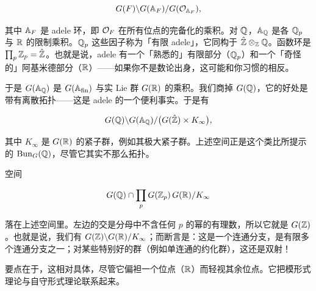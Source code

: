 \[G(F)\backslash G(\mathbb{A}_F)/G(\mathcal{O}_{\mathbb{A}_F}),\]

其中 $\mathbb{A}_F$ 是 adele 环，即 $\mathcal{O}_F$ 在所有位点的完备化的乘积。对 $\mathbb{Q}$，$\mathbb{A}_{\mathbb{Q}}$ 是各 $\mathbb{Q}_p$ 与 $\mathbb{R}$ 的限制乘积。$\mathbb{Q}_p$ 这些因子称为「有限 adele」，它同构于 $\hat{\mathbb{Z}}\otimes_{\mathbb{Z}}\mathbb{Q}$。函数环是 $\prod_p \mathbb{Z}_p=\hat{\mathbb{Z}}$。也就是说，adele 有一个「熟悉的」有限部分（$\mathbb{Q}_p$）和一个「奇怪的」阿基米德部分（$\mathbb{R}$）——如果你不是数论出身，这可能和你习惯的相反。

于是 $G(\mathbb{A}_{\mathbb{Q}})$ 是 $G(\mathbb{A}_{\mathrm{fin}})$ 与实 Lie 群 $G(\mathbb{R})$ 的乘积。我们商掉 $G(\mathbb{Q})$，它的好处是带有离散拓扑——这是 adele 的一个便利事实。于是有

\[G(\mathbb{Q})\backslash G(\mathbb{A}_{\mathbb{Q}})/\big(G(\hat{\mathbb{Z}})\times K_\infty\big),\]

其中 $K_\infty$ 是 $G(\mathbb{R})$ 的紧子群，例如其极大紧子群。上述空间正是这个类比所提示的 $\mathrm{Bun}_G(\mathbb{Q})$，尽管它其实不那么拓扑。

空间

\[G(\mathbb{Q})\cap \prod_p G(\mathbb{Z}_p)\,G(\mathbb{R})/K_\infty\]

落在上述空间里。左边的交是分母中不含任何 $p$ 的幂的有理数，所以它就是 $G(\mathbb{Z})$。也就是说，我们有 $G(\mathbb{Z})\backslash G(\mathbb{R})/K_\infty$；而断言是：这是一个连通分支，是有限多个连通分支之一；对某些特别好的群（例如单连通的约化群），这还是双射！

要点在于，这相对具体，尽管它偏袒一个位点（$\mathbb{R}$）而轻视其余位点。它把模形式理论与自守形式理论联系起来。

